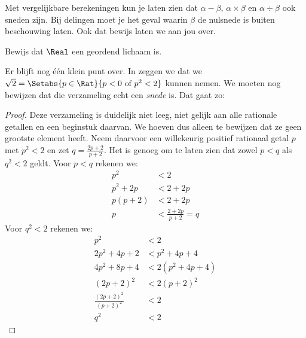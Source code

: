 \documentclass[openany]{memoir}
\begin{document}
Met vergelijkbare berekeningen kun je laten zien dat $\alpha - \beta$,
$\alpha \times \beta$ en $\alpha \div \beta$ ook sneden zijn. Bij
delingen moet je het geval waarin $\beta$ de nulsnede is buiten
beschouwing laten. Ook dat bewijs laten we aan jou over.
\begin{prob}
Bewijs dat $\Real$ een geordend lichaam is.
\end{prob}
Er blijft nog één klein punt over. In  zeggen we dat
we $\sqrt{2} = \Setabs{p \in \Rat}{p < 0 \text{ of }p^2 < 2}$ kunnen nemen.
We moeten nog bewijzen dat die verzameling echt een \emph{snede} is.
Dat gaat zo:
\begin{proof}
Deze verzameling is duidelijk niet leeg, niet gelijk aan alle
rationale getallen en een beginstuk daarvan. We hoeven dus alleen te
bewijzen dat ze geen grootste element heeft. Neem daarvoor een
willekeurig positief rationaal getal $p$ met $p^2 < 2$ en zet $q =
\frac{2p+2}{p+2}$. Het is genoeg om te laten zien dat zowel $p < q$
als $q^2 < 2$ geldt. Voor $p < q$ rekenen we:
\begin{align*}
	p^2 &< 2\\
	p^2 + 2p &< 2 + 2p\\
	p(p + 2) &< 2 + 2p\\
	p &< \tfrac{2+2p}{p+2} = q
\end{align*}
Voor $q^2 < 2$ rekenen we:
\begin{align*}
	p^2 &< 2\\
	2p^2 + 4p + 2 &< p^2 + 4p+ 4\\
	4p^2 + 8p + 4 &< 2(p^2 + 4p + 4)\\
	(2p+2)^2 & <2(p+2)^2\\
	\tfrac{(2p+2)^2}{(p+2)^2} &< 2\\
	q^2 &< 2
\end{align*}
\end{proof}
\endgroup

\begingroup
\def\olfilename{OLP-0048}
\def\olfilepath{content/sets-functions-relations/arithmetization/}
\hypertarget{unit-OLP-0048}{}
\end{document}
